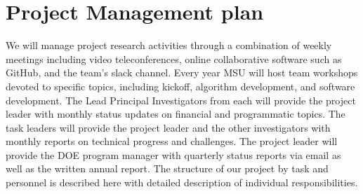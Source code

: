 \documentclass[10pt]{article}
\begin{document}
\section{Project Management plan}
We will manage project research activities through a combination of weekly meetings including
video teleconferences, online collaborative software such as GitHub, and the team’s slack channel.
Every year MSU will host team workshops devoted to specific topics, including kickoff,
algorithm development, and software development. The Lead Principal Investigators from each will provide the project leader with monthly status updates on financial and programmatic
topics. The task leaders will provide the project leader and the other investigators
with monthly reports on technical progress and challenges. The project leader will provide the
DOE program manager with quarterly status reports via email as well as the written annual report.
The structure of our project by task and personnel is described here with detailed
description of individual responsibilities.
\end{document}
